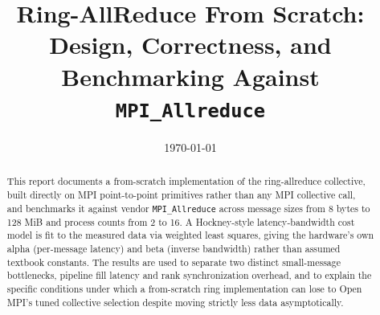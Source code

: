 \documentclass[11pt]{article}
\title{Ring-AllReduce From Scratch: \\ Design, Correctness, and Benchmarking Against \texttt{MPI\_Allreduce}}
\author{}
\date{\today}
\begin{document}
\maketitle
\vspace{-2.5em}

\begin{abstract}
This report documents a from-scratch implementation of the ring-allreduce collective, built directly on MPI point-to-point primitives rather than any MPI collective call, and benchmarks it against vendor \texttt{MPI\_Allreduce} across message sizes from 8 bytes to 128 MiB and process counts from 2 to 16. A Hockney-style latency-bandwidth cost model is fit to the measured data via weighted least squares, giving the hardware's own alpha (per-message latency) and beta (inverse bandwidth) rather than assumed textbook constants. The results are used to separate two distinct small-message bottlenecks, pipeline fill latency and rank synchronization overhead, and to explain the specific conditions under which a from-scratch ring implementation can lose to Open MPI's tuned collective selection despite moving strictly less data asymptotically.
\end{abstract}











\end{document}
